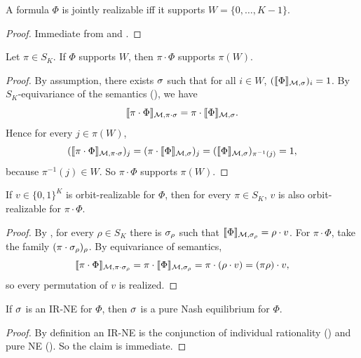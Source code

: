 \begin{lemma}
\label{lem:joint-real-max-support}
A formula $\Phi$ is jointly realizable iff it supports $W = \{0,\dots,K-1\}$.
\end{lemma}
\begin{proof}
Immediate from  and .
\end{proof}

\begin{lemma}
\label{lem:support-equivariant}
Let $\pi \in S_K$. If $\Phi$ supports $W$, then $\pi \cdot \Phi$ supports $\pi(W)$.
\end{lemma}
\begin{proof}
By assumption, there exists $\sigma$ such that for all $i \in W$,
$(\llbracket \Phi \rrbracket_{\mathcal M,\sigma})_i = 1$.
By $S_K$-equivariance of the semantics (), we have
\[
  \llbracket \pi \cdot \Phi \rrbracket_{\mathcal M, \pi \cdot \sigma}
  = \pi \cdot \llbracket \Phi \rrbracket_{\mathcal M,\sigma}.
\]
Hence for every $j \in \pi(W)$,
\[
  (\llbracket \pi \cdot \Phi \rrbracket_{\mathcal M, \pi \cdot \sigma})_j
  = (\pi \cdot \llbracket \Phi \rrbracket_{\mathcal M,\sigma})_j
  = (\llbracket \Phi \rrbracket_{\mathcal M,\sigma})_{\pi^{-1}(j)} = 1,
\]
because $\pi^{-1}(j) \in W$. So $\pi \cdot \Phi$ supports $\pi(W)$.
\end{proof}

\begin{lemma}
\label{lem:orbit-real-invariant}
If $v \in \{0,1\}^K$ is orbit-realizable for $\Phi$, then for every $\pi \in S_K$, $v$ is also orbit-realizable for $\pi \cdot \Phi$.
\end{lemma}
\begin{proof}
By , for every $\rho \in S_K$ there is $\sigma_\rho$ such that $\llbracket \Phi \rrbracket_{\mathcal M,\sigma_\rho} = \rho \cdot v$. For $\pi \cdot \Phi$, take the family $(\pi \cdot \sigma_\rho)_\rho$. By equivariance of semantics,
\[
  \llbracket \pi \cdot \Phi \rrbracket_{\mathcal M, \pi \cdot \sigma_\rho}
  = \pi \cdot \llbracket \Phi \rrbracket_{\mathcal M,\sigma_\rho}
  = \pi \cdot (\rho \cdot v)
  = (\pi \rho) \cdot v,
\]
so every permutation of $v$ is realized.
\end{proof}

\begin{lemma}[IR-NE is a refinement of NE]
\label{lem:irne-refines-ne}
If $\sigma$ is an IR-NE for $\Phi$, then $\sigma$ is a pure Nash equilibrium for $\Phi$.
\end{lemma}
\begin{proof}
By definition an IR-NE is the conjunction of individual rationality () and pure NE (). So the claim is immediate.
\end{proof}

